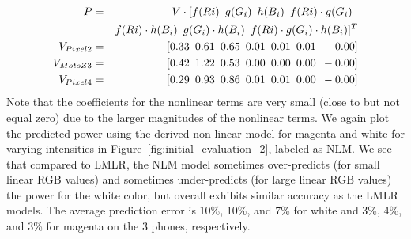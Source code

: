 \vspace{-0.1in}
  {\small
  \begin{eqnarray}
  P&=&V\cdot [ 
	    f(Ri)\mbox{\hspace{0.07in}}
	    g(G_i)\mbox{\hspace{0.07in}}
	    h(B_i)\mbox{\hspace{0.07in}}
	    f(Ri)\cdot g(G_i)\mbox{\hspace{0.07in}}\\
&&	    f(Ri)\cdot h(B_i)\mbox{\hspace{0.07in}}
	    g(G_i)\cdot h(B_i)\mbox{\hspace{0.07in}}
	    f(Ri)\cdot g(G_i)\cdot h(B_i)
  ]^T
	\nonumber \\
        V_{Pixel 2} &=& \lbrack 0.33\mbox{\hspace{0.07in}}
        0.61\mbox{\hspace{0.07in}}
        0.65\mbox{\hspace{0.07in}}
        0.01\mbox{\hspace{0.07in}}
        0.01\mbox{\hspace{0.07in}}
        0.01\mbox{\hspace{0.07in}}
        -0.00 \rbrack   \nonumber \\
        V_{Moto Z3} &=& \lbrack 0.42\mbox{\hspace{0.07in}}
        1.22\mbox{\hspace{0.07in}}
        0.53\mbox{\hspace{0.07in}}
        0.00\mbox{\hspace{0.07in}}
        0.00\mbox{\hspace{0.07in}}
        0.00\mbox{\hspace{0.07in}}  -0.00\rbrack \nonumber  \\
        V_{Pixel 4} &=& \lbrack 0.29\mbox{\hspace{0.07in}}
        0.93\mbox{\hspace{0.07in}}
        0.86\mbox{\hspace{0.07in}}
        0.01\mbox{\hspace{0.07in}}
        0.01\mbox{\hspace{0.07in}}
        0.00\mbox{\hspace{0.07in}}
        -0.00 \rbrack \nonumber 
\end{eqnarray}
}
\noindent
{}
Note that the coefficients for the nonlinear terms are very small (close to but not equal zero)
due to the larger magnitudes of the nonlinear terms.
We again plot the predicted power using the derived non-linear model
for magenta and white for varying intensities in
Figure~\ref{fig:initial_evaluation_2}, labeled as NLM.
We see that compared to LMLR, the NLM model 
sometimes over-predicts (for small linear RGB values)
and sometimes under-predicts (for large linear RGB values) the power for the
white color, but overall exhibits similar accuracy as the
LMLR models.
{The average prediction error is
10\%, 10\%, and 7\% for white
and 3\%, 4\%, and 3\% for magenta on the 3 phones, respectively.
}

